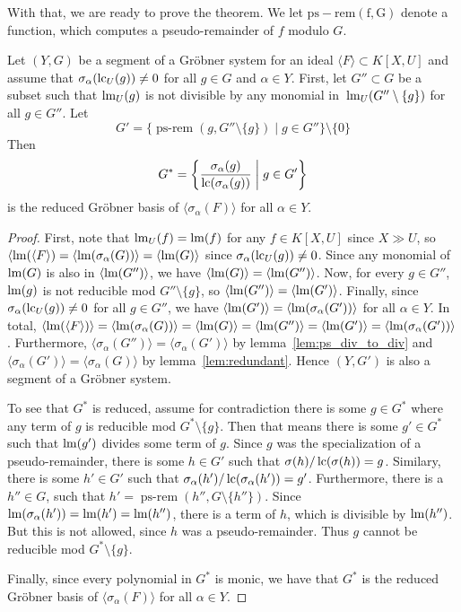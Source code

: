 With that, we are ready to prove the theorem. We let $\operatorname{ps-rem(f, G)}$ denote a function, which computes a pseudo-remainder of $f$ modulo $G$.

\begin{theorem}\label{thm:reduce_grb_system}
  Let $(Y, G)$ be a segment of a Gröbner system for an ideal $\langle F \rangle \subset K[X, U]$ and assume that $\sigma_{\alpha}(\operatorname{lc}_{U}(g)) \neq 0$ for all $g \in G$ and $\alpha \in Y$. First, let $G'' \subset G$ be a subset such that $\operatorname{lm}_{U}(g)$ is not divisible by any monomial in $\,\operatorname{lm}_{U}(G'' \setminus \{g\})$ for all $g \in G''$. Let
  \[G' = \{\operatorname{ps-rem}(g, G'' \setminus \{g\}) \mid g \in G''\} \setminus \{0\}\]
  Then
  \[G^{*} = \left\{\frac{\sigma_{\alpha}(g)}{\operatorname{lc}(\sigma_{\alpha}(g))} \;\bigg|\; g \in G'\right\}\]
  is the reduced Gröbner basis of $\langle \sigma_{\alpha}(F) \rangle$ for all $\alpha \in Y$.
\end{theorem}
\begin{proof}
  First, note that $\operatorname{lm}_{U}(f) = \operatorname{lm}(f)$ for any $f \in K[X, U]$ since $X \gg U$, so $\langle \operatorname{lm}(\langle F \rangle) = \langle \operatorname{lm}(\sigma_{\alpha}(G)) \rangle = \langle \operatorname{lm}(G) \rangle$ since $\sigma_{\alpha}(\operatorname{lc}_{U}(g)) \neq 0$. Since any monomial of $\operatorname{lm}(G)$ is also in $\langle \operatorname{lm}(G'') \rangle$, we have $\langle \operatorname{lm}(G) \rangle = \langle \operatorname{lm}(G'') \rangle$. Now, for every $g \in G''$, $\operatorname{lm}(g)$ is not reducible mod $G'' \setminus \{g\}$, so $\langle \operatorname{lm}(G'') \rangle = \langle \operatorname{lm}(G') \rangle$. Finally, since $\sigma_{\alpha}(\operatorname{lc}_{U}(g)) \neq 0$ for all $g \in G''$, we have $\langle \operatorname{lm}(G') \rangle = \langle \operatorname{lm}(\sigma_{\alpha}(G')) \rangle$ for all $\alpha \in Y$. In total, $\langle \operatorname{lm}(\langle F \rangle) \rangle = \langle \operatorname{lm}(\sigma_{\alpha}(G)) \rangle = \langle \operatorname{lm}(G) \rangle = \langle \operatorname{lm}(G'') \rangle = \langle \operatorname{lm}(G') \rangle = \langle \operatorname{lm}(\sigma_{\alpha}(G')) \rangle$. Furthermore, $\langle \sigma_{\alpha}(G'') \rangle = \langle \sigma_{\alpha}(G') \rangle$ by lemma~\ref{lem:ps_div_to_div} and $\langle \sigma_{\alpha}(G') \rangle = \langle \sigma_{\alpha}(G) \rangle$ by lemma~\ref{lem:redundant}. Hence $(Y, G')$ is also a segment of a Gröbner system.

  To see that $G^{*}$ is reduced, assume for contradiction there is some $g \in G^{*}$ where any term of $g$ is reducible mod $G^{*} \setminus \{g\}$. Then that means there is some $g' \in G^{*}$ such that $\operatorname{lm}(g')$ divides some term of $g$. Since $g$ was the specialization of a pseudo-remainder, there is some $h \in G'$ such that $\sigma(h)/\operatorname{lc}(\sigma(h)) = g$. Similary, there is some $h' \in G'$ such that $\sigma_{\alpha}(h')/\operatorname{lc}(\sigma_{\alpha}(h')) = g'$. Furthermore, there is a $h'' \in G$, such that $h' = \operatorname{ps-rem}(h'', G \setminus \{h''\})$. Since $\operatorname{lm}(\sigma_{\alpha}(h')) = \operatorname{lm}(h') = \operatorname{lm}(h'')$, there is a term of $h$, which is divisible by $\operatorname{lm}(h'')$. But this is not allowed, since $h$ was a pseudo-remainder. Thus $g$ cannot be reducible mod $G^{*} \setminus \{g\}$.

  Finally, since every polynomial in $G^*$ is monic, we have that $G^{*}$ is the reduced Gröbner basis of $\langle \sigma_{\alpha}(F) \rangle$ for all $\alpha \in Y$.
\end{proof}

